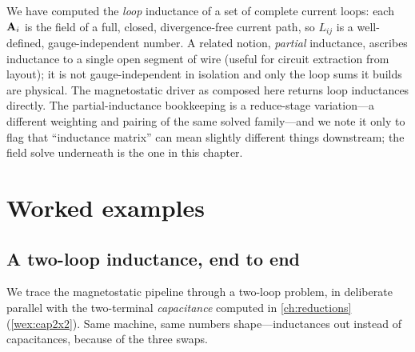 \begin{remark}
We have computed the \emph{loop} inductance of a set of complete current loops: each
$\mathbf{A}_i$ is the field of a full, closed, divergence-free current path, so $L_{ij}$ is
a well-defined, gauge-independent number. A related notion, \emph{partial}
inductance, ascribes inductance to a single open segment of wire (useful for
circuit extraction from layout); it is not gauge-independent in isolation and only
the loop sums it builds are physical. The magnetostatic driver as composed here
returns loop inductances directly. The partial-inductance bookkeeping is a
reduce-stage variation---a different weighting and pairing of the same solved
family---and we note it only to flag that ``inductance matrix'' can mean slightly
different things downstream; the field solve underneath is the one in this chapter.
\end{remark}

\section{Worked examples}

\subsection{A two-loop inductance, end to end}

We trace the magnetostatic pipeline through a two-loop problem, in deliberate
parallel with the two-terminal \emph{capacitance} computed in \cref{ch:reductions}
(\cref{wex:cap2x2}). Same machine, same numbers shape---inductances out instead of
capacitances, because of the three swaps.

